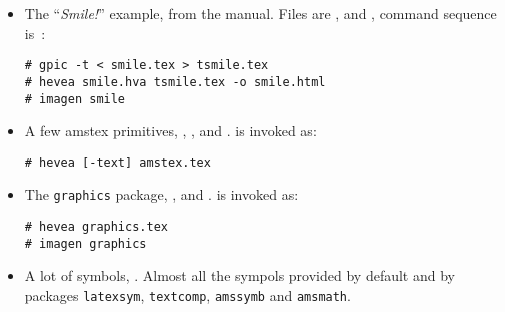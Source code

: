\documentclass{article}
\begin{document}
\begin{itemize}
\item The ``\emph{Smile!}'' example, from the manual.
Files are ,  and
, command sequence is~:
\begin{verbatim}
# gpic -t < smile.tex > tsmile.tex
# hevea smile.hva tsmile.tex -o smile.html
# imagen smile
\end{verbatim}

\item A few amstex primitives, ,
,  and .
\hevea{} is invoked as:
\begin{verbatim}
# hevea [-text] amstex.tex
\end{verbatim}

\item The \texttt{graphics} package, ,
 and .
\hevea{} is invoked as:
\begin{verbatim}
# hevea graphics.tex
# imagen graphics
\end{verbatim} 

\item A lot of symbols, .
Almost all the sympols provided by default and by packages
\texttt{latexsym},
\texttt{textcomp},
\texttt{amssymb} and \texttt{amsmath}.
\end{itemize}
\end{document}
